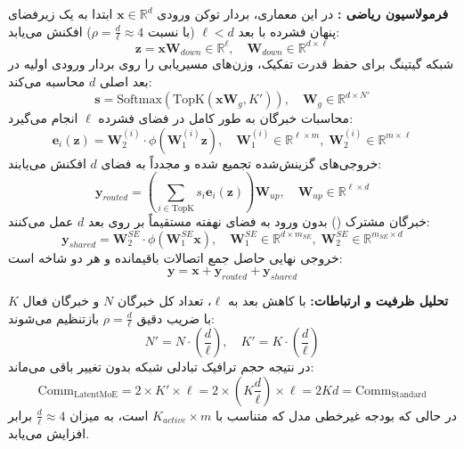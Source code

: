 \textbf{فرمولاسیون ریاضی :}
در این معماری، بردار توکن ورودی $\mathbf{x} \in \mathbb{R}^d$ ابتدا به یک زیرفضای پنهان فشرده با بعد $\ell < d$ (با نسبت $\rho = \frac{d}{\ell} \approx 4$) افکنش می‌یابد:
\begin{equation}
    \mathbf{z} = \mathbf{x} \mathbf{W}_{down} \in \mathbb{R}^\ell, \quad \mathbf{W}_{down} \in \mathbb{R}^{d \times \ell}
\end{equation}
شبکه گیتینگ برای حفظ قدرت تفکیک، وزن‌های مسیریابی را روی بردار ورودی اولیه در بعد اصلی $d$ محاسبه می‌کند:
\begin{equation}
    \mathbf{s} = \text{Softmax}(\text{TopK}(\mathbf{x} \mathbf{W}_g, K')), \quad \mathbf{W}_g \in \mathbb{R}^{d \times N'}
\end{equation}
محاسبات خبرگان به طور کامل در فضای فشرده $\ell$ انجام می‌گیرد:
\begin{equation}
    \mathbf{e}_i(\mathbf{z}) = \mathbf{W}_2^{(i)} \cdot \phi(\mathbf{W}_1^{(i)} \mathbf{z}), \quad \mathbf{W}_1^{(i)} \in \mathbb{R}^{\ell \times m}, \; \mathbf{W}_2^{(i)} \in \mathbb{R}^{m \times \ell}
\end{equation}
خروجی‌های گزینش‌شده تجمیع شده و مجدداً به فضای $d$ افکنش می‌یابند:
\begin{equation}
    \mathbf{y}_{routed} = \left( \sum_{i \in \text{TopK}} s_i \mathbf{e}_i(\mathbf{z}) \right) \mathbf{W}_{up}, \quad \mathbf{W}_{up} \in \mathbb{R}^{\ell \times d}
\end{equation}
خبرگان مشترک () بدون ورود به فضای نهفته مستقیماً بر روی بعد $d$ عمل می‌کنند:
\begin{equation}
    \mathbf{y}_{shared} = \mathbf{W}_2^{SE} \cdot \phi(\mathbf{W}_1^{SE} \mathbf{x}), \quad \mathbf{W}_1^{SE} \in \mathbb{R}^{d \times m_{SE}}, \; \mathbf{W}_2^{SE} \in \mathbb{R}^{m_{SE} \times d}
\end{equation}
خروجی نهایی حاصل جمع اتصالات باقیمانده و هر دو شاخه است:
\begin{equation}
    \mathbf{y} = \mathbf{x} + \mathbf{y}_{routed} + \mathbf{y}_{shared}
\end{equation}

\textbf{تحلیل ظرفیت و ارتباطات:}
با کاهش بعد به $\ell$، تعداد کل خبرگان $N$ و خبرگان فعال $K$ با ضریب دقیق $\rho = \frac{d}{\ell}$ بازتنظیم می‌شوند:
\begin{equation}
    N' = N \cdot \left(\frac{d}{\ell}\right), \quad K' = K \cdot \left(\frac{d}{\ell}\right)
\end{equation}
در نتیجه حجم ترافیک تبادلی شبکه بدون تغییر باقی می‌ماند:
\begin{equation}
    \text{Comm}_{\text{LatentMoE}} = 2 \times K' \times \ell = 2 \times \left(K \frac{d}{\ell}\right) \times \ell = 2 K d = \text{Comm}_{\text{Standard}}
\end{equation}
در حالی که بودجه غیرخطی مدل که متناسب با $K_{active} \times m$ است، به میزان $\frac{d}{\ell} \approx 4$ برابر افزایش می‌یابد.

